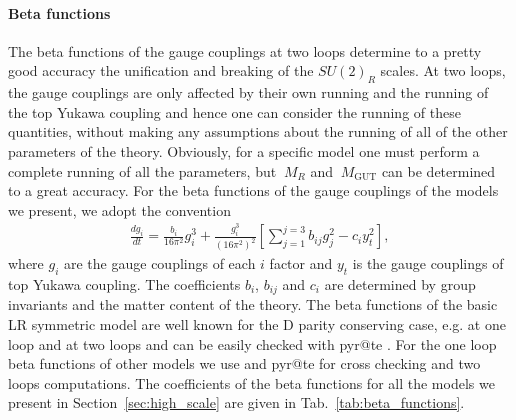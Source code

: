 \documentclass[11pt]{article}
\newcommand{\MG}{\:M_{\text{GUT}}}
\newcommand{\MR}{\:M_{R}}
\newcommand{\Tabref}[1]{Tab.~\ref{#1}}
\def\bea{\begin{eqnarray} }
\def\eea{ \end{eqnarray} }
\begin{document}
\paragraph{Beta functions}
The beta functions of the gauge couplings at two loops determine to a pretty good accuracy the unification and breaking of the $SU(2)_R$ scales. At two loops, the gauge couplings are only affected by their own running and the running of the top Yukawa coupling and hence one can consider the running of these quantities, without making any assumptions about the running of all of the other parameters of the theory. Obviously, for a specific model one must perform a complete running of all the parameters, but $\MR$ and $\MG$ can be determined to a great accuracy.
For the beta functions of the gauge couplings of the  models we present, we adopt the convention
\bea
\frac{d g_i}{dt} = \frac{b_i}{16\pi^2} g_i^3 +\frac{g_i^3}{(16 \pi^2)^2} \left[\sum_{j=1}^{j=3}  b_{ij} g_j^2 - c_i y_t^2\right],
\eea
where $g_i$ are the gauge couplings of each $i$ factor and $y_t$ is the gauge couplings of top Yukawa coupling. The coefficients $b_i$, $b_{ij}$ and $c_i$ are determined by group invariants and the matter content of the theory. The beta functions of the basic LR symmetric model are well known for the D parity conserving case, e.g. at one loop \cite{Lindner:1996tf} and at two loops \cite{Chakrabortty:2017mgi,Chakrabortty:2019fov} and can be easily checked 
with pyr@te \cite{pyr@te}. For the one loop beta functions of other models we use \cite{Lindner:1996tf} and pyr@te \cite{pyr@te} for cross checking and two loops computations. The coefficients of the beta functions for all the models we present in Section~\ref{sec:high_scale} are given in \Tabref{tab:beta_functions}.
\end{document}

